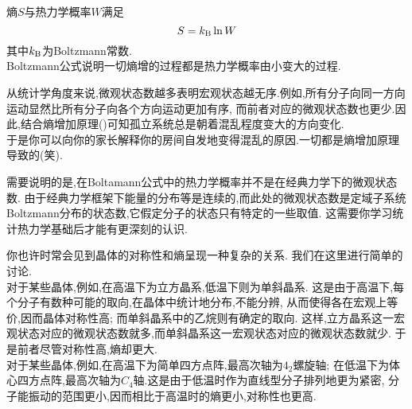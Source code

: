 \documentclass{ctexart}
\begin{document}
\begin{theorem}[3B.1.1 Boltzmann公式]
    熵$S$与热力学概率$W$满足
    \[S=k_\text B\ln W\]
    其中$k_\text B$为Boltzmann常数.\\
    Boltzmann公式说明一切熵增的过程都是热力学概率由小变大的过程.
\end{theorem}
从统计学角度来说,微观状态数越多表明宏观状态越无序.例如,所有分子向同一方向运动显然比所有分子向各个方向运动更加有序,%
而前者对应的微观状态数也更少.因此,结合熵增加原理()可知孤立系统总是朝着混乱程度变大的方向变化.\\
\indent 于是你可以向你的家长解释你的房间自发地变得混乱的原因.一切都是熵增加原理导致的(笑).
\begin{hint}
    需要说明的是,在Boltamann公式中的热力学概率并不是在经典力学下的微观状态数.%
    由于经典力学框架下能量的分布等是连续的,而此处的微观状态数是定域子系统Boltzmann分布的状态数,它假定分子的状态只有特定的一些取值.%
    这需要你学习统计热力学基础后才能有更深刻的认识.
\end{hint}\vspace{8pt}
\indent 你也许时常会见到晶体的对称性和熵呈现一种复杂的关系.%
我们在这里进行简单的讨论.\\
\indent 对于某些晶体,例如,在高温下为立方晶系,低温下则为单斜晶系.%
这是由于高温下,每个分子有数种可能的取向,在晶体中统计地分布,不能分辨,%
从而使得各在宏观上等价,因而晶体对称性高;%
而单斜晶系中的乙烷则有确定的取向.%
这样,立方晶系这一宏观状态对应的微观状态数就多,而单斜晶系这一宏观状态对应的微观状态数就少.%
于是前者尽管对称性高,熵却更大.\\
\indent 对于某些晶体,例如,在高温下为简单四方点阵,最高次轴为$4_2$螺旋轴;%
在低温下为体心四方点阵,最高次轴为$C_4$轴.这是由于低温时作为直线型分子排列地更为紧密,%
分子能振动的范围更小,因而相比于高温时的熵更小,对称性也更高.
\end{document}

